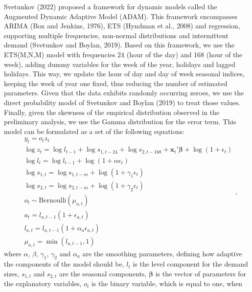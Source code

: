 \documentclass[]{elsarticle} %
\begin{document}
Svetunkov (2022) proposed a framework for dynamic models called the
Augmented Dynamic Adaptive Model (ADAM). This framework encompasses
ARIMA (Box and Jenkins, 1976), ETS (Hyndman et al., 2008) and regression, supporting
multiple frequencies, non-normal distributions and intermittent demand
(Svetunkov and Boylan, 2019). Based on this framework, we use the ETS(M,N,M) model
with frequencies 24 (hour of the day) and 168 (hour of the week), adding
dummy variables for the week of the year, holidays and lagged holidays.
This way, we update the hour of day and day of week seasonal indices,
keeping the week of year one fixed, thus reducing the number of
estimated parameters. Given that the data exhibits randomly occurring
zeroes, we use the direct probability model of Svetunkov and Boylan (2019) to treat
those values. Finally, given the skewness of the empirical distribution
observed in the preliminary analysis, we use the Gamma distribution for
the error term. This model can be formulated as a set of the following
equations: \begin{equation}
    \begin{aligned}
      & y_t = o_t z_t \\
        & \log z_t = \log l_{t-1} + \log s_{1,t-24} + \log s_{2,t-168} + \mathbf{x}_t' \boldsymbol{\beta} + \log \left(1 + \epsilon_{t} \right) \\
        & \log l_{t} = \log l_{t-1} + \log( 1  + \alpha \epsilon_{t}) \\ 
        & \log s_{1,t} = \log s_{1,t-m} + \log( 1  + \gamma_1 \epsilon_{t}) \\
        & \log s_{2,t} = \log s_{2,t-m} + \log( 1  + \gamma_2 \epsilon_{t}) \\
        & o_t \sim \text{Bernoulli} \left(\mu_{a,t} \right) \\
        & a_t = l_{a,t-1} \left(1 + \epsilon_{a,t} \right) \\
        & l_{a,t} = l_{a,t-1}( 1  + \alpha_{a} \epsilon_{a,t}) \\
        & \mu_{a,t} = \min(l_{a,t-1}, 1)
    \end{aligned} ,
    \label{eq:ADAMModel}
\end{equation} where \(\alpha\), \(\beta\), \(\gamma_1\), \(\gamma_2\) and
\(\alpha_a\) are the smoothing parameters, defining how adaptive the
components of the model should be, \(l_t\) is the level component for the
demand sizes, \(s_{1,t}\) and \(s_{2,t}\) are the seasonal components,
\(\boldsymbol{\beta}\) is the vector of parameters for the explanatory
variables, \(o_t\) is the binary variable, which is equal to one, when
\end{document}
